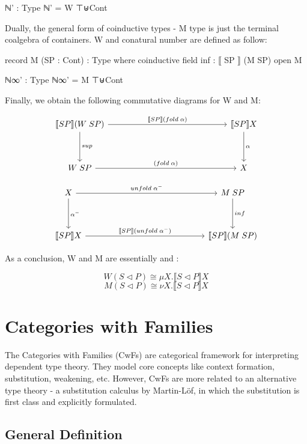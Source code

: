 {\begin{code}
ℕ' : Type
ℕ' = W ⊤⊎Cont
\end{code}

Dually, the general form of coinductive types - M type is just the terminal coalgebra of containers. W and conatural number are defined as follow:

\begin{code}
record M (SP : Cont) : Type where
  coinductive
  field
    inf : ⟦ SP ⟧ (M SP)
open M

ℕ∞' : Type
ℕ∞' = M ⊤⊎Cont
\end{code}

Finally, we obtain the following commutative diagrams for W and M:

\[
\begin{tikzcd}[row sep=huge, column sep=5.0cm]
\llbracket SP \rrbracket (W\;SP) \arrow[r, "\llbracket SP \rrbracket (fold\;\alpha)"] \arrow[d, "sup"]
& \llbracket SP \rrbracket X \arrow[d, "\alpha"] \\
W\;SP \arrow[r, "(fold\;\alpha)"]
& X
\end{tikzcd}
\]

\[
\begin{tikzcd}[row sep=huge, column sep=5.0cm]
X \arrow[r, "unfold\;\alpha^{-}"] \arrow[d, "\alpha^{-}"]
& M\;SP \arrow[d, "inf"] \\
\llbracket SP \rrbracket X \arrow[r, "\llbracket SP \rrbracket (unfold\;\alpha^{-})"]
& \llbracket SP \rrbracket (M\;SP)
\end{tikzcd}
\]

As a conclusion, W and M are essentially \mu and \nu:

\[ W(S \triangleleft P) \cong \mu X. \llbracket S \triangleleft P \rrbracket X \]
\[ M(S \triangleleft P) \cong \nu X. \llbracket S \triangleleft P \rrbracket X \]

\section{Categories with Families}

The Categories with Families (CwFs) are categorical framework for interpreting dependent type theory. They model core concepts like context formation, substitution, weakening, etc. However, CwFs are more related to an alternative type theory - a substitution calculus by Martin-Löf, in which the substitution is first class and explicitly formulated.

\subsection{General Definition}

}
